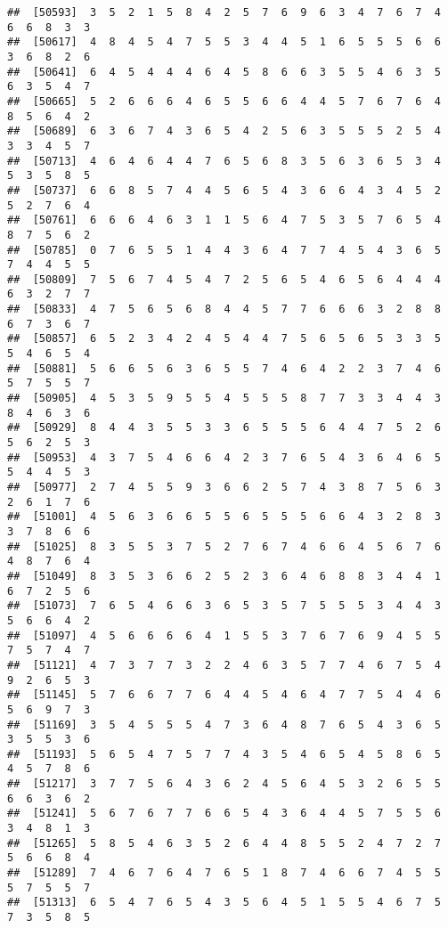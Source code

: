 \documentclass[
]{book}
\begin{document}
\begin{verbatim}
##  [50593]  3  5  2  1  5  8  4  2  5  7  6  9  6  3  4  7  6  7  4  6  6  8  3  3
##  [50617]  4  8  4  5  4  7  5  5  3  4  4  5  1  6  5  5  5  6  6  3  6  8  2  6
##  [50641]  6  4  5  4  4  4  6  4  5  8  6  6  3  5  5  4  6  3  5  6  3  5  4  7
##  [50665]  5  2  6  6  6  4  6  5  5  6  6  4  4  5  7  6  7  6  4  8  5  6  4  2
##  [50689]  6  3  6  7  4  3  6  5  4  2  5  6  3  5  5  5  2  5  4  3  3  4  5  7
##  [50713]  4  6  4  6  4  4  7  6  5  6  8  3  5  6  3  6  5  3  4  5  3  5  8  5
##  [50737]  6  6  8  5  7  4  4  5  6  5  4  3  6  6  4  3  4  5  2  5  2  7  6  4
##  [50761]  6  6  6  4  6  3  1  1  5  6  4  7  5  3  5  7  6  5  4  8  7  5  6  2
##  [50785]  0  7  6  5  5  1  4  4  3  6  4  7  7  4  5  4  3  6  5  7  4  4  5  5
##  [50809]  7  5  6  7  4  5  4  7  2  5  6  5  4  6  5  6  4  4  4  6  3  2  7  7
##  [50833]  4  7  5  6  5  6  8  4  4  5  7  7  6  6  6  3  2  8  8  6  7  3  6  7
##  [50857]  6  5  2  3  4  2  4  5  4  4  7  5  6  5  6  5  3  3  5  5  4  6  5  4
##  [50881]  5  6  6  5  6  3  6  5  5  7  4  6  4  2  2  3  7  4  6  5  7  5  5  7
##  [50905]  4  5  3  5  9  5  5  4  5  5  5  8  7  7  3  3  4  4  3  8  4  6  3  6
##  [50929]  8  4  4  3  5  5  3  3  6  5  5  5  6  4  4  7  5  2  6  5  6  2  5  3
##  [50953]  4  3  7  5  4  6  6  4  2  3  7  6  5  4  3  6  4  6  5  5  4  4  5  3
##  [50977]  2  7  4  5  5  9  3  6  6  2  5  7  4  3  8  7  5  6  3  2  6  1  7  6
##  [51001]  4  5  6  3  6  6  5  5  6  5  5  5  6  6  4  3  2  8  3  3  7  8  6  6
##  [51025]  8  3  5  5  3  7  5  2  7  6  7  4  6  6  4  5  6  7  6  4  8  7  6  4
##  [51049]  8  3  5  3  6  6  2  5  2  3  6  4  6  8  8  3  4  4  1  6  7  2  5  6
##  [51073]  7  6  5  4  6  6  3  6  5  3  5  7  5  5  5  3  4  4  3  5  6  6  4  2
##  [51097]  4  5  6  6  6  6  4  1  5  5  3  7  6  7  6  9  4  5  5  7  5  7  4  7
##  [51121]  4  7  3  7  7  3  2  2  4  6  3  5  7  7  4  6  7  5  4  9  2  6  5  3
##  [51145]  5  7  6  6  7  7  6  4  4  5  4  6  4  7  7  5  4  4  6  5  6  9  7  3
##  [51169]  3  5  4  5  5  5  4  7  3  6  4  8  7  6  5  4  3  6  5  3  5  5  3  6
##  [51193]  5  6  5  4  7  5  7  7  4  3  5  4  6  5  4  5  8  6  5  4  5  7  8  6
##  [51217]  3  7  7  5  6  4  3  6  2  4  5  6  4  5  3  2  6  5  5  6  6  3  6  2
##  [51241]  5  6  7  6  7  7  6  6  5  4  3  6  4  4  5  7  5  5  6  3  4  8  1  3
##  [51265]  5  8  5  4  6  3  5  2  6  4  4  8  5  5  2  4  7  2  7  5  6  6  8  4
##  [51289]  7  4  6  7  6  4  7  6  5  1  8  7  4  6  6  7  4  5  5  5  7  5  5  7
##  [51313]  6  5  4  7  6  5  4  3  5  6  4  5  1  5  5  4  6  7  5  7  3  5  8  5

\end{verbatim}
\end{document}
